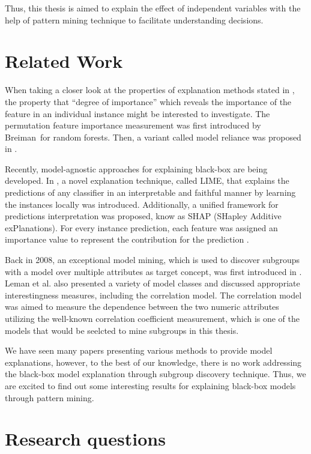 \documentclass[runningheads]{llncs}
\begin{document}
	Thus, this thesis is aimed to explain the effect of independent variables with the help of pattern mining technique to facilitate understanding decisions.
	
	
	\section{Related Work}
	
	When taking a closer look at the properties of explanation methods stated in \cite{robnik2018perturbation}, the property that “degree of importance” which reveals the importance of the feature in an individual instance might be interested to investigate. The permutation feature importance measurement was first introduced by Breiman\cite{breiman2001random} for random forests. Then, a variant called model reliance was proposed in \cite{fisher2018model}. 
	
	Recently, model-agnostic approaches for explaining black-box are being developed. In \cite{ribeiro2016should}, a novel explanation technique, called LIME,  that explains the predictions of any classifier in an interpretable and faithful manner by learning the instances locally was introduced. Additionally, a unified framework for predictions interpretation was proposed, know as SHAP (SHapley Additive exPlanations). For every instance prediction, each feature was assigned an importance value to represent the contribution for the prediction \cite{lundberg2017unified}.
	
	Back in 2008, an exceptional model mining, which is used to discover subgroups with a model over multiple attributes as target concept, was first introduced in \cite{leman2008exceptional}. Leman et al. also presented a variety of model classes and discussed appropriate interestingness measures, including the correlation model. The correlation model was aimed to measure the dependence between the two numeric attributes utilizing the well-known correlation coefficient measurement, which is one of the models that would be seelcted to mine subgroups in this thesis. 
	
	We have seen many papers presenting various methods to provide model explanations, however, to the best of our knowledge, there is no work addressing the black-box model explanation through subgroup discovery technique. Thus, we are excited to find out some interesting results for explaining black-box models through pattern mining. 
	
	\section{Research questions}
	
\end{document}

